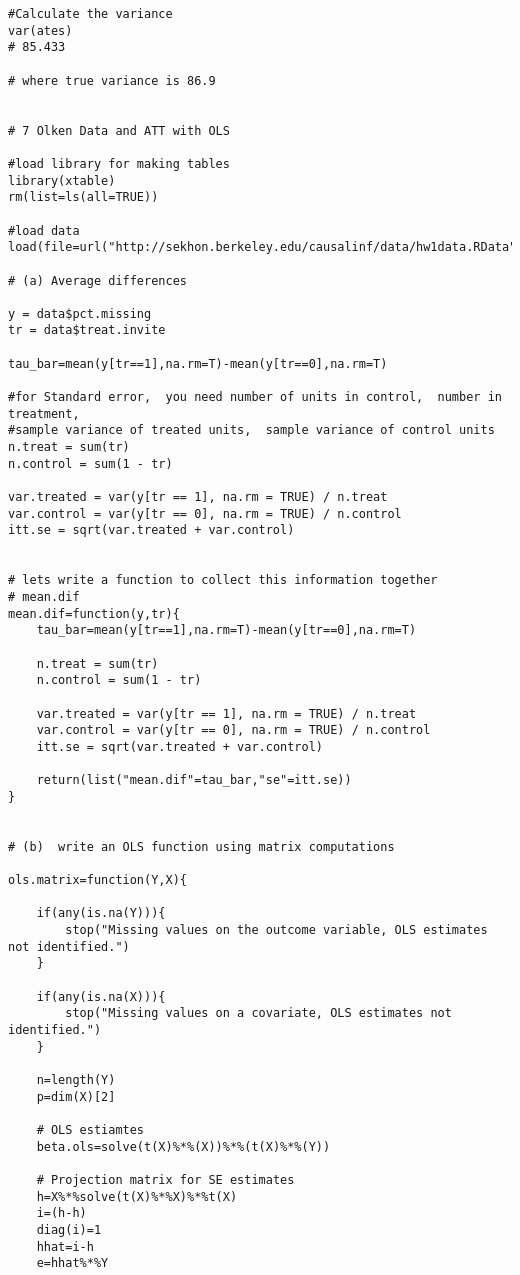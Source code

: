 \documentclass{article}
\begin{document}
\begin{verbatim}
#Calculate the variance
var(ates)                   
# 85.433

# where true variance is 86.9 
         

# 7 Olken Data and ATT with OLS

#load library for making tables
library(xtable)
rm(list=ls(all=TRUE))

#load data
load(file=url("http://sekhon.berkeley.edu/causalinf/data/hw1data.RData"))

# (a) Average differences 
     
y = data$pct.missing    
tr = data$treat.invite

tau_bar=mean(y[tr==1],na.rm=T)-mean(y[tr==0],na.rm=T)

#for Standard error,  you need number of units in control,  number in treatment,
#sample variance of treated units,  sample variance of control units
n.treat = sum(tr)
n.control = sum(1 - tr)      

var.treated = var(y[tr == 1], na.rm = TRUE) / n.treat
var.control = var(y[tr == 0], na.rm = TRUE) / n.control
itt.se = sqrt(var.treated + var.control)  
               

# lets write a function to collect this information together 
# mean.dif
mean.dif=function(y,tr){
	tau_bar=mean(y[tr==1],na.rm=T)-mean(y[tr==0],na.rm=T)
	
	n.treat = sum(tr)
	n.control = sum(1 - tr)      

	var.treated = var(y[tr == 1], na.rm = TRUE) / n.treat
	var.control = var(y[tr == 0], na.rm = TRUE) / n.control
	itt.se = sqrt(var.treated + var.control)	   
	      
	return(list("mean.dif"=tau_bar,"se"=itt.se)) 
}


# (b)  write an OLS function using matrix computations
    
ols.matrix=function(Y,X){
	         		
	if(any(is.na(Y))){
		stop("Missing values on the outcome variable, OLS estimates not identified.")
	}               
	
	if(any(is.na(X))){
		stop("Missing values on a covariate, OLS estimates not identified.")
	} 
	
	n=length(Y)
	p=dim(X)[2]

	# OLS estiamtes
	beta.ols=solve(t(X)%*%(X))%*%(t(X)%*%(Y))     
                   
	# Projection matrix for SE estimates
	h=X%*%solve(t(X)%*%X)%*%t(X)
	i=(h-h)
	diag(i)=1  
	hhat=i-h               
	e=hhat%*%Y
     	

\end{verbatim}
\end{document}
